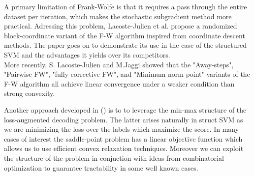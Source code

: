 \documentclass{article}
\begin{document}
A primary limitation of Frank-Wolfe is that it requires a pass through the
entire dataset per iteration, which makes the stochastic subgradient method more
practical. Adressing this problem, Lacoste-Julien et al.
\cite{DBLP:journals/corr/abs-1207-4747} propose a randomized block-coordinate
variant of the F-W algorithm inspired from coordinate descent methods. The paper
goes on to demonstrate its use in the case of the structured SVM and the
advantages it yields over its competitors.\\ More recently, S. Lacoste-Julien
and M.Jaggi \cite{2015arXiv151105932L} showed that the "Away-steps", "Pairwise
FW", "fully-corrective FW", and "Minimum norm point" variants of the F-W
algorithm all achieve linear convergence under a weaker condition than strong
convexity.

Another approach developed in (\cite{dualextraSimon}) is to to leverage the
min-max structure of the loss-augmented decoding problem. The latter arises
naturally in struct SVM as we are minimizing the loss over the labels which
maximize the score. In many cases of interest the saddle-point problem has a
linear objective function which allows us to use efficient convex relaxation
techniques. Moreover we can exploit the structure of the problem in conjuction
with ideas from combinatorial optimization to guarantee tractability in some
well known cases.
\end{document}
